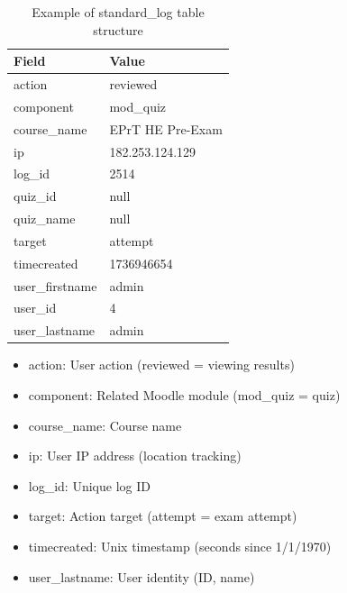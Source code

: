 \begin{table}[htbp]
\centering
\caption{Example of standard\_log table structure}
\label{tab:json_log_example}
\begin{tabular}{|l|l|}
\hline
\textbf{Field} & \textbf{Value} \\ \hline
action & reviewed \\ \hline
component & mod\_quiz \\ \hline
course\_name & EPrT HE Pre-Exam \\ \hline
ip & 182.253.124.129 \\ \hline
log\_id & 2514 \\ \hline
quiz\_id & null \\ \hline
quiz\_name & null \\ \hline
target & attempt \\ \hline
timecreated & 1736946654 \\ \hline
user\_firstname & admin \\ \hline
user\_id & 4 \\ \hline
user\_lastname & admin \\ \hline
\end{tabular}
\end{table}

\begin{itemize}
    \item action: User action (reviewed = viewing results)
    \item component: Related Moodle module (mod\_quiz = quiz)
    \item course\_name: Course name
    \item ip: User IP address (location tracking)
    \item log\_id: Unique log ID
    \item target: Action target (attempt = exam attempt)
    \item timecreated: Unix timestamp (seconds since 1/1/1970)
    \item user\_lastname: User identity (ID, name)
\end{itemize}

